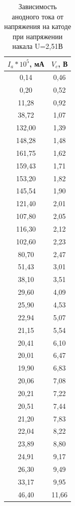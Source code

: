 \documentclass[a4paper,12pt]{article}
\begin{document}
\begin{table}[h]
\centering
\caption{Зависимость анодного тока от напряжения на катоде при напряжении накала U=2,51В}
\label{table3:VAC_1}
\begin{tabular}{|c|c|}
\hline
$I_a *10^5$, мА & $V_c$, В \\ \hline
0,14 & 0,46 \\ \hline
0,20 & 0,52 \\ \hline
11,28 & 0,92 \\ \hline
38,72 & 1,07 \\ \hline
132,00 & 1,39 \\ \hline
148,28 & 1,48 \\ \hline
161,75 & 1,62 \\ \hline
159,43 & 1,71 \\ \hline
153,20 & 1,82 \\ \hline
145,54 & 1,90 \\ \hline
121,40 & 2,01 \\ \hline
107,80 & 2,05 \\ \hline
116,30 & 2,12 \\ \hline
102,60 & 2,23 \\ \hline
80,70 & 2,47 \\ \hline
51,43 & 3,01 \\ \hline
38,10 & 3,51 \\ \hline
29,60 & 4,09 \\ \hline
25,90 & 4,53 \\ \hline
22,94 & 5,07 \\ \hline
21,15 & 5,54 \\ \hline
20,41 & 6,10 \\ \hline
20,01 & 6,47 \\ \hline
19,90 & 6,83 \\ \hline
20,06 & 7,08 \\ \hline
20,21 & 7,22 \\ \hline
20,51 & 7,44 \\ \hline
21,20 & 7,83 \\ \hline
22,04 & 8,22 \\ \hline
23,89 & 8,80 \\ \hline
24,91 & 9,17 \\ \hline
26,30 & 9,49 \\ \hline
33,17 & 9,95 \\ \hline
46,40 & 11,66 \\ \hline
\end{tabular}
\end{table}
\end{document}
